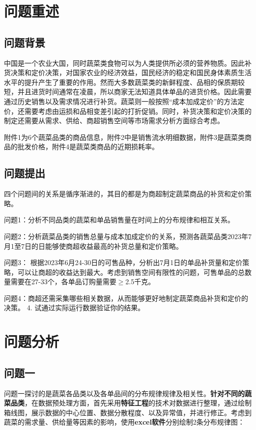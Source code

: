 \documentclass[withoutpreface,bwprint]{cumcmthesis} %
\begin{document}
\section{问题重述}

\subsection{问题背景}
中国是一个农业大国，同时蔬菜类食物可以为人类提供所必须的营养物质。因此补货决策和定价决策，对国家农业的经济效益，国民经济的稳定和国民身体素质生活水平的提升产生了重要的作用。然而大多数蔬菜类的新鲜程度、品相的保质期较短，并且进货时间通常在凌晨，所以商家无法知道具体单品的进货价格。因此需要通过历史销售以及需求情况进行补货。蔬菜则一般按照“成本加成定价”的方法定价，还需要考虑由运损和品相变差引起的打折促销。同时，补货决策和定价决策的制定还需要从需求、供给、商超销售空间等市场需求分析方面综合考虑。

附件1为6个蔬菜品类的商品信息，附件2中是销售流水明细数据，附件3是蔬菜类商品的批发价格，附件4是蔬菜类商品的近期损耗率。


\subsection{问题提出}
四个问题间的关系是循序渐进的，其目的都是为商超制定蔬菜商品的补货和定价策略。

问题1：分析不同品类的蔬菜和单品销售量在时间上的分布规律和相互关系。

问题2：分析蔬菜品类的销售总量与成本加成定价的关系，预测各蔬菜品类2023年7月1至7日的日能够使商超收益最高的补货总量和定价策略。

问题3： 根据2023年6月24-30日的可售品种，分析出7月1日的单品补货量和定价策略，可以让商超的收益达到最大。考虑到销售空间有限性的问题，可售单品的总数量需要在27-33个，各单品订购量需要$\geq$2.5千克。

问题4：商超还需采集哪些相关数据，从而能够更好地制定蔬菜商品补货和定价的决策。
4. 试通过实际运行数据验证你的结果。

\section{问题分析}

\subsection{问题一}

问题一探讨的是蔬菜各品类以及各单品间的分布规律规律及相关性。\textbf{针对不同的蔬菜品类}，在数据预处理方面，首先采用\textbf{特征工程}的技术对数据进行整理，通过绘制箱线图，展示数据的中心位置、数据分散程度、以及异常值，并进行修正。考虑到蔬菜的需求量、供给量等因素的影响，使用\textbf{excel软件}分别绘制2条分布规律图：
\end{document}
